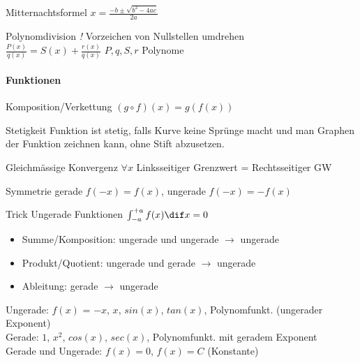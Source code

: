 
\begin{lemma}{Mitternachtsformel}
    $x=\frac{-b\pm\sqrt{b^2-4ac}}{2a}$
\end{lemma}

\begin{theorem}{Polynomdivision} \emph{!} Vorzeichen von Nullstellen umdrehen\\
    $\frac{P(x)}{q(x)} = S(x) + \frac{r(x)}{q(x)}$ \qquad $P,q,S,r$ Polynome
\end{theorem}


\raggedcolumns
\paragraph{Funktionen}
\small

\begin{definition}
    {Komposition/Verkettung} $(g \circ f)(x)=g(f(x))$
\end{definition}


\begin{definition}{Stetigkeit} \small
    Funktion ist stetig, falls Kurve keine Sprünge macht und man Graphen der Funktion zeichnen kann, ohne Stift abzusetzen.
\end{definition}

\begin{definition}{Gleichmässige Konvergenz}
    $\forall x$ Linksseitiger Grenzwert = Rechtsseitiger GW
\end{definition}

\begin{concept}{Symmetrie} gerade $f(-x)=f(x)$, ungerade $f(-x)=-f(x)$
\end{concept}

\begin{KR}{Trick Ungerade Funktionen}
    $\int_{-a}^{+a} f(x) \dif x = 0$
    \begin{itemize}
        \item Summe/Komposition: ungerade und ungerade $\rightarrow$ ungerade
        \item Produkt/Quotient: ungerade und gerade $\rightarrow$ ungerade
        \item Ableitung: gerade $\longrightarrow$ ungerade
    \end{itemize}
    Ungerade: $f(x)$ = $-x$, $x$, $sin(x)$, $tan(x)$, Polynomfunkt. (ungerader Exponent)\\
    Gerade: $1$, $x^2$, $cos(x)$, $sec(x)$, Polynomfunkt. mit geradem Exponent\\
    Gerade und Ungerade: $f(x) = 0$, $f(x) = C$ (Konstante)
\end{KR}


